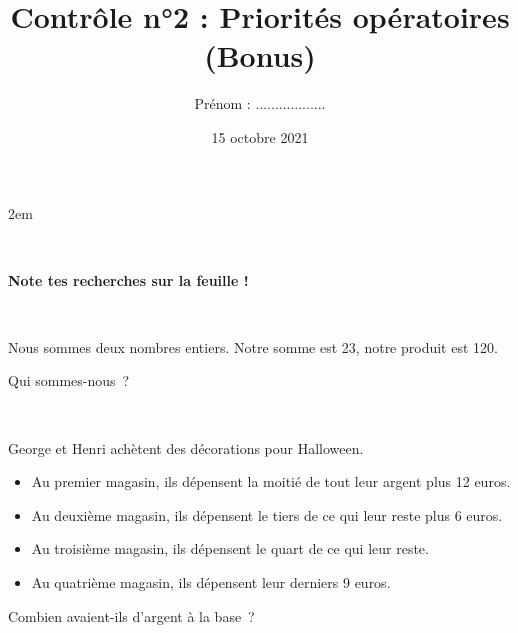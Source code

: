 \documentclass[a4paper,11pt]{article}
\title{Contrôle n°2 : Priorités opératoires (Bonus)}
\date{15 octobre 2021}
\author{Prénom : ..................}
\makeatletter
\renewcommand{\maketitle}{%
    \topskip2em
	\@author \hfill \@date \\

	\begin{center}
		\begin{huge}
			\@title \\[2em]
		\end{huge}
	\end{center}
}
\makeatother
\begin{document}
\maketitle

\begin{center}
	\large
	\textbf{Note tes recherches sur la feuille !}
\end{center}

\begin{question*}[Bonus]\

	Nous sommes deux nombres entiers. Notre somme est 23, notre produit est 120.

	Qui sommes-nous ?
	\vspace{10em}
\end{question*}

\begin{question*}[Bonus]\

	George et Henri achètent des décorations pour Halloween.
	\begin{itemize}
		\item Au premier magasin, ils dépensent la moitié de tout leur argent plus 12 euros.
		\item Au deuxième magasin, ils dépensent le tiers de ce qui leur reste plus 6 euros.
		\item Au troisième magasin, ils dépensent le quart de ce qui leur reste.
		\item Au quatrième magasin, ils dépensent leur derniers 9 euros.
	\end{itemize}
	Combien avaient-ils d’argent à la base ?
\end{question*}
\end{document}
